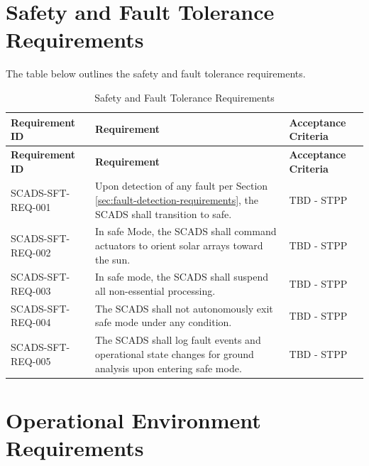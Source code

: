 \documentclass{article}
\begin{document}
    \section{Safety and Fault Tolerance Requirements}\label{sftrqs}

        The table below outlines the safety and fault tolerance requirements.

        \renewcommand{\arraystretch}{1.4}
        \begin{longtable}{|l|p{9cm}|p{5cm}|}
            \caption{Safety and Fault Tolerance Requirements} \\
            \hline
            \textbf{Requirement ID} & \textbf{Requirement} & 
            \textbf{Acceptance Criteria} \\ \hline
            \endfirsthead

            \hline
            \textbf{Requirement ID} & \textbf{Requirement} & 
            \textbf{Acceptance Criteria} \\ \hline
            \endhead
            \hline
            \endfoot
            SCADS-SFT-REQ-001 & Upon detection of any fault per Section 
                                \ref{sec:fault-detection-requirements}, the 
                                SCADS shall transition to safe.
                              & TBD - STPP \\ \hline
            SCADS-SFT-REQ-002 & In safe Mode, the SCADS shall command actuators 
                                to orient solar arrays toward the sun.
                              & TBD - STPP \\ \hline
            SCADS-SFT-REQ-003 & In safe mode, the SCADS shall suspend all 
                                non-essential processing.
                              & TBD - STPP \\ \hline
            SCADS-SFT-REQ-004 & The SCADS shall not autonomously exit safe mode 
                                under any condition.
                              & TBD - STPP \\ \hline
            SCADS-SFT-REQ-005 & The SCADS shall log fault events and operational 
                                state changes for ground analysis upon entering
                                safe mode.
                              & TBD - STPP \\ \hline
            \end{longtable}

    \section{Operational Environment Requirements}\label{sec:operational-environment-requirements}
\end{document}
